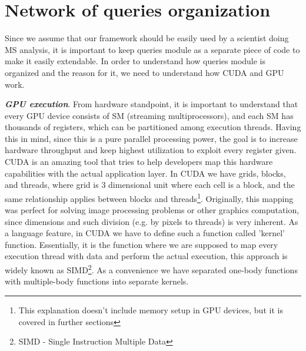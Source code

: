 \documentclass[11pt,a4paper]{report}
\begin{document}
\section{Network of queries organization}

Since we assume that our framework should be easily used by a scientist doing MS analysis, it is important to keep queries module as a separate piece of code to make it easily extendable. In order to understand how queries module is organized and the reason for it, we need to understand how CUDA and GPU work.

\emph{\textbf{GPU execution}}. From hardware standpoint, it is important to understand that every GPU device consists of SM (streaming multiprocessors), and each SM has thousands of registers, which can be partitioned among execution threads. Having this in mind, since this is a pure parallel processing power, the goal is to increase hardware throughput and keep highest utilization to exploit every register given. CUDA is an amazing tool that tries to help developers map this hardware capabilities with the actual application layer. In CUDA we have grids, blocks, and threads, where grid is 3 dimensional unit where each cell is a block, and the same relationship applies between blocks and threads\footnote{This explanation doesn't include memory setup in GPU devices, but it is covered in further sections}. Originally, this mapping was perfect for solving image processing problems or other graphics computation, since dimensions and such division (e.g. by pixels to threads) is very inherent. As a language feature, in CUDA we have to define such a function called 'kernel' function. Essentially, it is the function where we are supposed to map every execution thread with data and perform the actual execution, this approach is widely known as SIMD\footnote{SIMD - Single Instruction Multiple Data}. As a convenience we have separated one-body functions with multiple-body functions into separate kernels.
\end{document}
